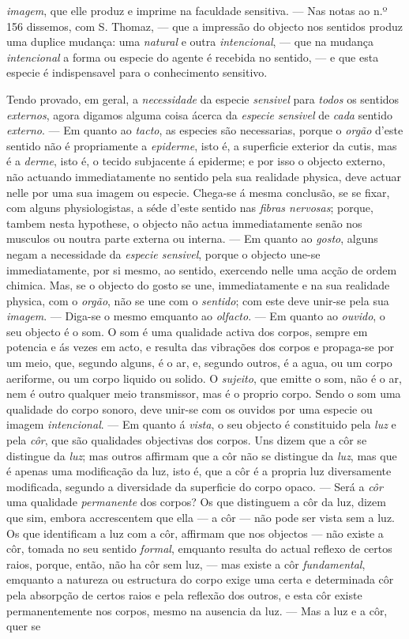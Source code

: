 \emph{imagem}, que elle produz e imprime na faculdade sensitiva. --- Nas notas ao n.º 156 dissemos, com S. Thomaz, --- que a impressão do objecto nos sentidos produz uma duplice mudança: uma \emph{natural} e outra \emph{intencional}, --- que na mudança \emph{intencional} a forma ou especie do agente é recebida no sentido, --- e que esta especie é indispensavel para o conhecimento sensitivo.\par Tendo provado, em geral, a \emph{necessidade} da especie \emph{sensivel} para \emph{todos} os sentidos \emph{externos}, agora digamos alguma coisa ácerca da \emph{especie sensivel} de \emph{cada} sentido \emph{externo}. --- Em quanto ao \emph{tacto}, as especies são necessarias, porque o \emph{orgão} d'este sentido não é propriamente a \emph{epiderme}, isto é, a superficie exterior da cutis, mas é a \emph{derme}, isto é, o tecido subjacente á epiderme; e por isso o objecto externo, não actuando immediatamente no sentido pela sua realidade physica, deve actuar nelle por uma sua imagem ou especie. Chega-se á mesma conclusão, se se fixar, com alguns physiologistas, a séde d'este sentido nas \emph{fibras nervosas}; porque, tambem nesta hypothese, o objecto não actua immediatamente senão nos musculos ou noutra parte externa ou interna. --- Em quanto ao \emph{gosto}, alguns negam a necessidade da \emph{especie sensivel}, porque o objecto une-se immediatamente, por si mesmo, ao sentido, exercendo nelle uma acção de ordem chimica. Mas, se o objecto do gosto se une, immediatamente e na sua realidade physica, com o \emph{orgão}, não se une com o \emph{sentido}; com este deve unir-se pela sua \emph{imagem}. --- Diga-se o mesmo emquanto ao \emph{olfacto}. --- Em quanto ao \emph{ouvido}, o seu objecto é o som. O som é uma qualidade activa dos corpos, sempre em potencia e ás vezes em acto, e resulta das vibrações dos corpos e propaga-se por um meio, que, segundo alguns, é o ar, e, segundo outros, é a agua, ou um corpo aeriforme, ou um corpo liquido ou solido. O \emph{sujeito}, que emitte o som, não é o ar, nem é outro qualquer meio transmissor, mas é o proprio corpo. Sendo o som uma qualidade do corpo sonoro, deve unir-se com os ouvidos por uma especie ou imagem \emph{intencional}. --- Em quanto á \emph{vista}, o seu objecto é constituido pela \emph{luz} e pela \emph{côr}, que são qualidades objectivas dos corpos. Uns dizem que a côr se distingue da \emph{luz}; mas outros affirmam que a côr não se distingue da \emph{luz}, mas que é apenas uma modificação da luz, isto é, que a côr é a propria luz diversamente modificada, segundo a diversidade da superficie do corpo opaco. --- Será a \emph{côr} uma qualidade \emph{permanente} dos corpos? Os que distinguem a côr da luz, dizem que sim, embora accrescentem que ella --- a côr --- não pode ser vista sem a luz. Os que identificam a luz com a côr, affirmam que nos objectos --- não existe a côr, tomada no seu sentido \emph{formal}, emquanto resulta do actual reflexo de certos raios, porque, então, não ha côr sem luz, --- mas existe a côr \emph{fundamental}, emquanto a natureza ou estructura do corpo exige uma certa e determinada côr pela absorpção de certos raios e pela reflexão dos outros, e esta côr existe permanentemente nos corpos, mesmo na ausencia da luz. --- Mas a luz e a côr, quer se 